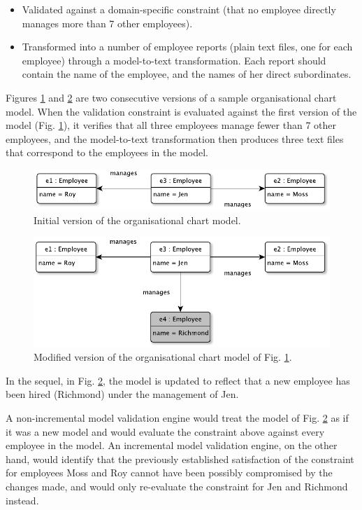 \documentclass{llncs}
\begin{document}
\begin{itemize}
\item Validated against a domain-specific constraint (that no employee directly manages more than 7 other employees).
\item Transformed into a number of employee reports (plain text files, one for each employee) through a model-to-text transformation. Each report should contain the name of the employee, and the names of her direct subordinates.
\end{itemize}

Figures \ref{image1} and \ref{image2} are two consecutive versions of a sample organisational chart model. When the validation constraint is evaluated against the first version of the model (Fig. \ref{image1}), it verifies that all three employees manage fewer than 7 other employees, and the model-to-text transformation then produces three text files that correspond to the employees in the model.

\begin{figure}[b!]
\centering
\includegraphics[width=\linewidth]{image1}
\caption{Initial version of the organisational chart model.}
\label{image1}
\end{figure}

\begin{figure}[b!]
\centering
\includegraphics[width=\linewidth]{image2}
\caption{Modified version of the organisational chart model of Fig. \ref{image1}.}
\label{image2}
\end{figure}

In the sequel, in Fig. \ref{image2}, the model is updated to reflect that a new employee has been hired (Richmond) under the management of Jen. 

A non-incremental model validation engine would treat the model of Fig. \ref{image2} as if it was a new model and would evaluate the constraint above against every employee in the model. An incremental model validation engine, on the other hand, would identify that the previously established satisfaction of the constraint for employees Moss and Roy cannot have been possibly compromised by the changes made, and would only re-evaluate the constraint for Jen and Richmond instead. 
\end{document}
